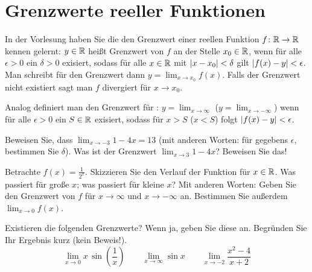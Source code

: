 \documentclass{scrartcl}
\begin{document}
\section{Grenzwerte reeller Funktionen}
In der Vorlesung haben Sie die den Grenzwert einer reellen Funktion $f\colon \mathbb{R} \to \mathbb{R}$ kennen gelernt:
$y \in \mathbb{R}$ heißt Grenzwert von $f$ an der Stelle $x_0 \in \mathbb{R}$, wenn für alle $\epsilon > 0$ ein $\delta > 0$ exisiert, sodass für alle $x \in \mathbb{R}$ mit $\left\vert x - x_0 \right\vert < \delta$ gilt $\left\vert f(x) - y \right\vert < \epsilon$.
Man schreibt für den Grenzwert dann $y = \lim_{x \to x_0} f(x)$.
Falls der Grenzwert nicht existiert sagt man $f$ divergiert für $x \to x_0$.

Analog definiert man den Grenzwert für : 
$y = \lim_{x \to \infty}$ ($y = \lim_{x \to -\infty}$) wenn für alle $\epsilon > 0$ ein $S \in \mathbb{R}$ exisiert, sodass für $x > S$ ($x < S$) folgt $\left\vert f(x) - y \right\vert < \epsilon$. 

\begin{subex}
  \item Beweisen Sie, dass $\lim_{x \to -3} 1 - 4x = 13$ (mit anderen Worten: für gegebens $\epsilon$, bestimmen Sie $\delta$).
  Was ist der Grenzwert $\lim_{x \to 3} 1 - 4x$?
  Beweisen Sie das!
  \item Betrachte $f(x) = \frac{1}{2^x}$.
  Skizzieren Sie den Verlauf der Funktion für $x \in \mathbb{R}$.
  Was passiert für große $x$; was passiert für kleine $x$?
  Mit anderen Worten: Geben Sie den Grenzwert von $f$ für $x \to \infty$ und $x \to -\infty$ an.
  Bestimmen Sie außerdem $\lim_{x \to 0} f(x)$.
  \item Existieren die folgenden Grenzwerte? 
  Wenn ja, geben Sie diese an.
  Begründen Sie Ihr Ergebnis kurz (kein Beweis!).
  \[
    \lim_{x \to 0} x \, \sin \left( \frac{1}{x} \right)  \quad\quad
    \lim_{x \to \infty} \sin x  \quad\quad 
    \lim_{x \to -2} \frac{x^2 - 4}{x + 2}
  \]
\end{subex}

\end{document}
